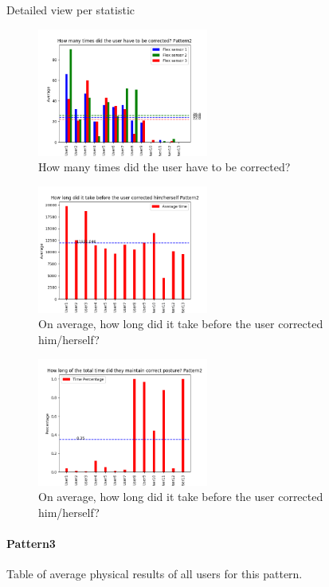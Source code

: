 \documentclass[sigconf]{acmart}
\begin{document}
Detailed view per statistic
\begin{figure}[h!]
\centering
\includegraphics[width=0.5\textwidth, scale=1]{p2_q1.png}
\caption{How many times did the user have to be corrected?}
\end{figure}

\begin{figure}[h!]
\centering
\includegraphics[width=0.5\textwidth, scale=1]{p2_q2.png}
\caption{On average, how long did it take before the user corrected him/herself?}
\end{figure}

\begin{figure}[h!]
\centering
\includegraphics[width=0.5\textwidth, scale=1]{p2_q3.png}
\caption{On average, how long did it take before the user corrected him/herself?}
\end{figure}






\paragraph {Pattern3}
Table of average physical results of all users for this pattern.\\
\end{document}
